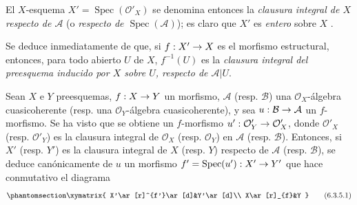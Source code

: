 \documentclass[oneside,10pt]{amsart}
\makeatletter
\newcommand{\ega@arrow}[2]{\mathchoice{#1}{#2}{#2}{#2}}
\renewcommand{\to}{\ega@arrow{\longrightarrow}{\rightarrow}}
\let\EGAOriginalLabel\label
\renewcommand{\label}[1]{\phantomsection\EGAOriginalLabel{#1}}
\makeatother
\begin{document}
El $X$-esquema $X'=\operatorname{Spec}(\mathcal{O}'_X)$ se denomina entonces la \emph{clausura integral de $X$ respecto de $\mathcal{A}$} (o \emph{respecto de $\operatorname{Spec}(\mathcal{A})$});
es claro que $X'$ es \emph{entero} sobre $X$ .

Se deduce inmediatamente de  que, si $f:X'\to X$ es el morfismo estructural, entonces, para todo abierto $U$ de $X$, $f^{-1}(U)$ es la \emph{clausura integral del preesquema inducido por $X$ sobre $U$, respecto de $\mathcal{A}|U$}.

\begin{env}[6.3.5]
\label{II.6.3.5-fr}
Sean $X$ e $Y$ preesquemas, $f:X\to Y$ un morfismo, $\mathcal{A}$ (resp. $\mathcal{B}$) una $\mathcal{O}_X$-álgebra cuasicoherente (resp. una $\mathcal{O}_Y$-álgebra cuasicoherente), y sea $u:\mathcal{B}\to\mathcal{A}$ un $f$-morfismo.
Se ha visto  que se obtiene un $f$-morfismo $u':\mathcal{O}'_Y\to\mathcal{O}'_X$, donde $\mathcal{O}'_X$ (resp. $\mathcal{O}'_Y$) es la clausura integral de $\mathcal{O}_X$ (resp. $\mathcal{O}_Y$) en $\mathcal{A}$ (resp. $\mathcal{B}$).
Entonces, si $X'$ (resp. $Y'$) es la clausura integral de $X$ (resp. $Y$) respecto de $\mathcal{A}$ (resp. $\mathcal{B}$), se deduce canónicamente de $u$ un morfismo $f'=\operatorname{Spec}(u'):X'\to Y'$  que hace conmutativo el diagrama
\[
\label{II.6.3.5.1-fr}
\xymatrix{
X'\ar[r]^{f'}\ar[d]&Y'\ar[d]\\
X\ar[r]_{f}&Y
}
\tag{6.3.5.1}
\]
\end{env}
\end{document}
